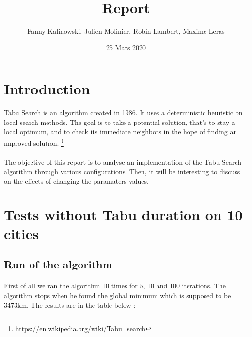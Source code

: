 \documentclass[12pt,oneside,a4paper]{article}
\begin{document}
\title{Report}
\author{Fanny Kalinowski, Julien Molinier, Robin Lambert, Maxime Leras}
\date{25 Mars 2020}
\maketitle
\newpage    
\tableofcontents

\newpage
{}
\section{Introduction}
\paragraph{}
    Tabu Search is an algorithm created in 1986. It uses a deterministic heuristic on
    local search methods. The goal is to take a potential solution, that's to stay a local optimum,  
    and to check its immediate neighbors in the hope of finding an improved solution.
    \footnote{https://en.wikipedia.org/wiki/Tabu\_search}
\paragraph{}
    The objective of this report is to analyse an implementation of the Tabu Search algorithm through various configurations.
    Then, it will be interesting to discuss on the effects of changing the paramaters values.

\section{Tests without Tabu duration on 10 cities}
\subsection{Run of the algorithm}
\paragraph{}
    First of all we ran the algorithm 10 times for 5, 10 and 100 iterations. The algorithm stops when he found
    the global minimum which is supposed to be 3473km. The results are in the table below :    
\end{document}
